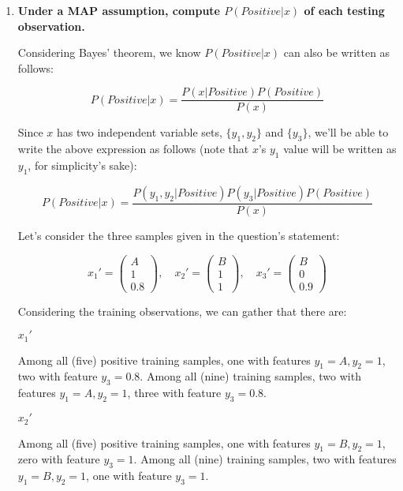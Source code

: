 \documentclass[12pt]{article}
\begin{document}
\begin{enumerate}[leftmargin=\labelsep]
  \pagebreak

  \item \textbf{Under a MAP assumption, compute $P(Positive | x)$ of each testing observation.}

  Considering Bayes' theorem, we know $P(Positive | x)$ can also be written as follows:

  $$
  P(Positive | x) = \frac{P(x| Positive) P(Positive)}{P(x)}
  $$

  Since $x$ has two independent variable sets, $\{y_1, y_2\}$ and $\{y_3\}$, we'll be
  able to write the above expression as follows (note that $x$'s $y_1$ value will
  be written as $y_1$, for simplicity's sake):

  $$
  P(Positive | x) = \frac{P(y_1, y_2| Positive) P(y_3| Positive) P(Positive)}{P(x)}
  $$

  Let's consider the three samples given in the question's statement:

  $$
    x_1' = \begin{pmatrix}
      A \\
      1 \\
      0.8
    \end{pmatrix}, \quad
    x_2' = \begin{pmatrix}
      B \\
      1 \\
      1
    \end{pmatrix}, \quad
    x_3' = \begin{pmatrix}
      B \\
      0 \\
      0.9
    \end{pmatrix}
  $$

  Considering the training observations, we can gather that there are:

  \begin{multicols}{3}
    \setlength{\columnseprule}{1pt}
    \def\columnseprulecolor{\color{black}}
    \centering

    $x_1'$

    Among all (five) positive training samples, one with features $y_1 = A, y_2 = 1$,
    two with feature $y_3 = 0.8$.
    Among all (nine) training samples, two with features $y_1 = A, y_2 = 1$, three
    with feature $y_3 = 0.8$.

    \columnbreak

    $x_2'$

    Among all (five) positive training samples, one with features $y_1 = B, y_2 = 1$,
    zero with feature $y_3 = 1$.
    Among all (nine) training samples, two with features $y_1 = B, y_2 = 1$, one
    with feature $y_3 = 1$.


\end{multicols}
\end{enumerate}
\end{document}
